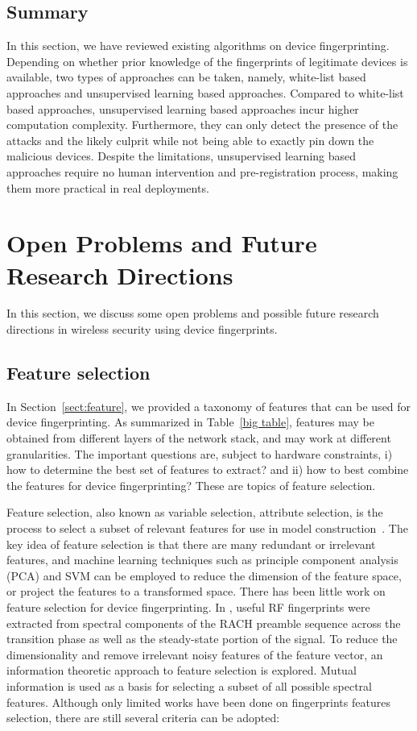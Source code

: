 \documentclass[journal,draftcls,onecolumn,11pt]{IEEEtran}
\newcounter{ctr}\setcounter{ctr}{0}
\begin{document}
\subsection{Summary}

In this section, we have reviewed existing algorithms on device fingerprinting.  Depending on whether prior knowledge of the fingerprints of legitimate devices is available, two types of approaches can be taken, namely, white-list based approaches and unsupervised learning based approaches. Compared to white-list based approaches, unsupervised learning based approaches incur higher computation complexity. Furthermore, they can only detect the presence of the attacks and the likely culprit while not being able to exactly pin down the malicious devices. Despite the limitations, unsupervised learning based approaches require no human intervention and pre-registration process, making them more practical in real deployments.

\section{Open Problems and Future Research Directions}
\label{sect:future}
In this section, we discuss some open problems and possible future research directions in wireless security using device fingerprints.

\subsection{Feature selection}

In Section~\ref{sect:feature}, we provided a taxonomy of features that can be used for device fingerprinting. As summarized in Table~\ref{big table}, features may be obtained from different layers of the network stack, and may work at different granularities. The important questions are, subject to hardware constraints, i) how to determine the best set of features to extract?  and ii) how to best combine the features for device fingerprinting? These are topics of feature selection.

Feature selection, also known as variable selection, attribute selection, is the process to select a subset of relevant features for use in model construction~\cite{Guyon2003}.  The key idea of feature selection is that there are many redundant or irrelevant features, and machine learning techniques such as principle component analysis (PCA) and SVM can be employed to reduce the dimension of the feature space, or project the features to a transformed space. There has been little work on feature selection for device fingerprinting. In \cite{Scanlon2010}, useful RF fingerprints were extracted from spectral components of the RACH preamble sequence across the transition phase as well as the steady-state portion of the signal. To reduce the dimensionality and remove irrelevant noisy features of the feature vector, an information theoretic approach to feature selection is explored. Mutual information is used as a basis for selecting a subset of all possible spectral features. Although only limited works have been done on fingerprints features selection, there are still several criteria can be adopted:
\end{document}
